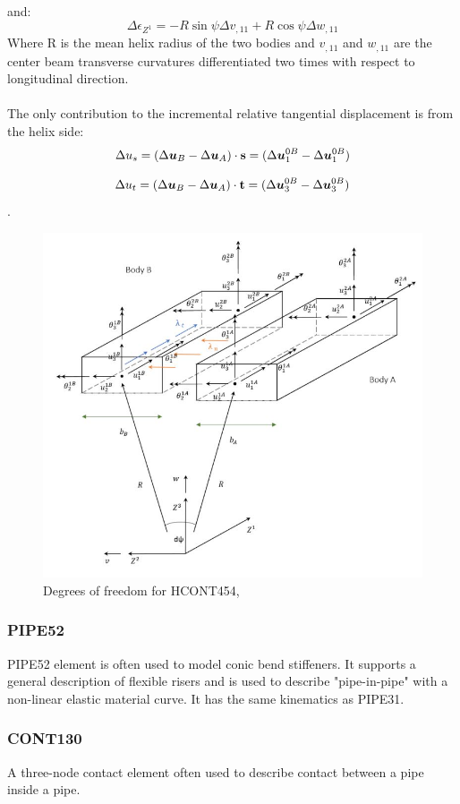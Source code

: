 and:
\begin{equation}
    \Delta \epsilon_{Z^1} = -R \sin \psi \Delta v_{,11} + R \cos \psi \Delta w_{,11}
\end{equation}
Where R is the mean helix radius of the two bodies and $v_{,11}$ and $w_{,11}$ are the center beam transverse curvatures differentiated  two times with respect to longitudinal direction. \\\\ The only contribution to the  incremental relative tangential displacement is from the helix side:
\begin{equation}
    \Delta u_s = (\Delta \boldsymbol{u}_B -\Delta \boldsymbol{u}_A) \cdot \bold{s}=(\Delta \boldsymbol{u}_1^{0B} -\Delta \boldsymbol{u}_1^{0B})
\end{equation}

\begin{equation}
    \Delta u_t = (\Delta \boldsymbol{u}_B -\Delta \boldsymbol{u}_A) \cdot \bold{t}=(\Delta \boldsymbol{u}_3^{0B} -\Delta \boldsymbol{u}_3^{0B})
\end{equation}. 

\begin{figure}[H]
\centering
\includegraphics[scale=0.7]{figures/hcont454}
\caption[$\; \:$HCONT454]{Degrees of freedom for HCONT454, \cite{Bflextheory2017} }
 \label{fig:HCONT454}
\end{figure}

\subsubsection{PIPE52}
PIPE52 element is often used to model conic bend stiffeners. It supports a general description of flexible risers and is used to describe "pipe-in-pipe" with a non-linear elastic material curve. It has the same kinematics as PIPE31. 

\subsubsection{CONT130}
A three-node contact element often used to describe contact between a pipe inside a pipe. 







